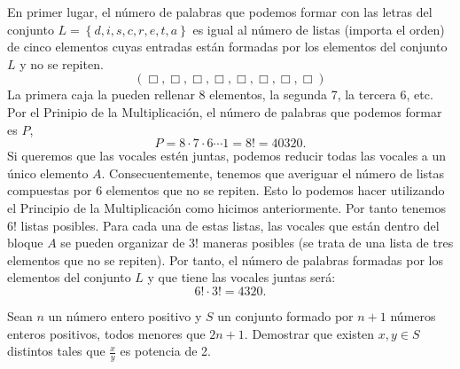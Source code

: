 \documentclass{article}
\begin{document}
\begin{sol}
	En primer lugar, el número de palabras que podemos formar con las letras del conjunto $\displaystyle L =\left\{ d, i, s, c, r, e, t, a\right\}  $ es igual al número de listas (importa el orden) de cinco elementos cuyas entradas están formadas por los elementos del conjunto $\displaystyle L $ y no se repiten. 
	\[\left(\Box, \Box, \Box, \Box, \Box, \Box, \Box, \Box\right) \]
La primera caja la pueden rellenar 8 elementos, la segunda 7, la tercera 6, etc. Por el Prinipio de la Multiplicación, el número de palabras que podemos formar es $\displaystyle P $, 
\[P = 8 \cdot 7\cdot 6 \cdots 1 = 8!=40320 .\]
Si queremos que las vocales estén juntas, podemos reducir todas las vocales a un único elemento $\displaystyle A $. Consecuentemente, tenemos que averiguar el número de listas compuestas por 6 elementos que no se repiten. Esto lo podemos hacer utilizando el Principio de la Multiplicación como hicimos anteriormente. Por tanto tenemos $\displaystyle 6! $ listas posibles. Para cada una de estas listas, las vocales que están dentro del bloque $\displaystyle A $ se pueden organizar de $\displaystyle 3! $ maneras posibles (se trata de una lista de tres elementos que no se repiten). Por tanto, el número de palabras formadas por los elementos del conjunto $\displaystyle L $ y que tiene las vocales juntas será:
\[6!\cdot3!=4320 .\]
\end{sol}

\begin{ej}
Sean $\displaystyle n $ un número entero positivo y $\displaystyle S $ un conjunto formado por $\displaystyle n+1 $ números enteros positivos, todos menores que $\displaystyle 2n+1 $. Demostrar que existen $\displaystyle x,y\in S $ distintos tales que $\displaystyle \frac{x}{y} $ es potencia de 2.
\end{ej}
\end{document}

